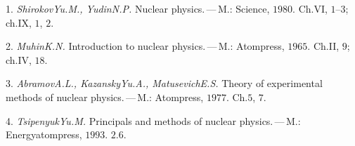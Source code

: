 \vspace{-8pt}
\begin{center}\end{center}
\vspace{-4pt}
{\small

1. \textit{Shirokov\;Yu.\;M., Yudin\;N.\;P.} Nuclear physics.\,---\,M.: Science, $1980$. Ch.\;VI, \textsection\textsection\;$1$--$3$; ch.\;IX, \textsection\textsection\;$1$, $2$.

2. \textit{Muhin\;K.\;N.} Introduction to nuclear physics.\,---\,M.: Atompress, $1965$. Ch.\;II, \textsection\;$9$; ch.\;IV, \textsection\;$18$.

3. \textit{Abramov\;A.\;L., Kazansky\;Yu.\;A., Matusevich\;E.\;S.} Theory of experimental methods of nuclear physics.\,---\,M.: Atompress, $1977$. Ch.\;$5$, $7$.

4. \textit{Tsipenyuk\;Yu.\;M.} Principals and methods of nuclear physics.\,---\,M.: Energyatompress, $1993$. \textsection\;$2{.}6$.
}